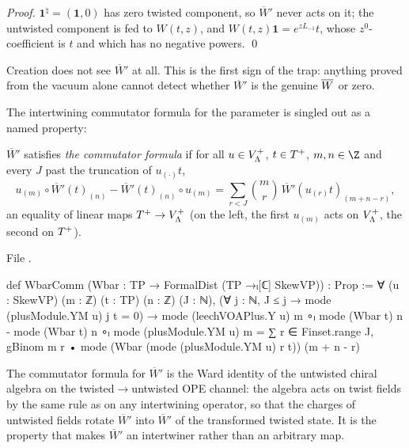 \emph{Proof.}  $\mathbf1^\natural=(\mathbf1,0)$ has zero twisted component, so $\overline W'$ never
acts on it; the untwisted component is fed to $W(t,z)$, and $W(t,z)\mathbf1=e^{zL_{-1}}t$, whose
$z^0$-coefficient is $t$ and which has no negative powers. \qed

\begin{warning}
Creation does not see $\overline W'$ at all.  This is the first sign of the trap: anything proved
from the vacuum alone cannot detect whether $\overline W'$ is the genuine $\overline{W}$ or zero.
\end{warning}

The intertwining commutator formula for the parameter is singled out as a named property:

\begin{definition}\label{ch10:def:WbarComm}
$\overline W'$ satisfies \emph{the commutator formula} if for all $u\in V_{\Lambda}^{+}$, $t\in T^{+}$,
$m,n\in\Z$ and every $J$ past the truncation of $u_{(\cdot)}t$,
\begin{equation*}
 u_{(m)}\circ\overline W'(t)_{(n)}-\overline W'(t)_{(n)}\circ u_{(m)}
 =\sum_{r<J}\binom mr\,\overline W'(u_{(r)}t)_{(m+n-r)} ,
\end{equation*}
an equality of linear maps $T^{+}\to V_{\Lambda}^{+}$ (on the left, the first $u_{(m)}$ acts on
$V_{\Lambda}^{+}$, the second on $T^{+}$).
\end{definition}
\noindent File .
\begin{leancode}
def WbarComm (Wbar : TP → FormalDist (TP →ₗ[ℂ] SkewVP)) : Prop :=
  ∀ (u : SkewVP) (m : ℤ) (t : TP) (n : ℤ) (J : ℕ),
    (∀ j : ℕ, J ≤ j → mode (plusModule.YM u) j t = 0) →
    mode (leechVOAPlus.Y u) m ∘ₗ mode (Wbar t) n - mode (Wbar t) n ∘ₗ mode (plusModule.YM u) m
      = ∑ r ∈ Finset.range J, gBinom m r • mode (Wbar (mode (plusModule.YM u) r t)) (m + n - r)
\end{leancode}

\begin{physics}
The commutator formula for $\overline W'$ is the Ward identity of the untwisted chiral algebra on the twisted$\to$untwisted OPE channel: the algebra acts on twist fields by the same rule as on any intertwining operator, so that the charges of untwisted fields rotate $\overline W'$ into $\overline W'$ of the transformed twisted state. It is the property that makes $\overline W'$ an intertwiner rather than an arbitrary map.
\end{physics}

